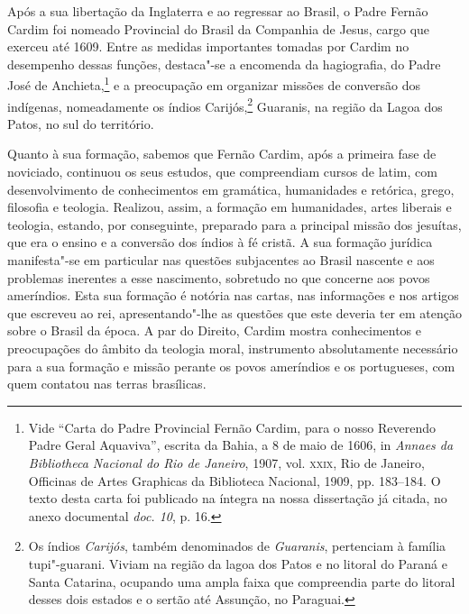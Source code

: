 Após a sua libertação da Inglaterra e ao regressar ao Brasil, o Padre
Fernão Cardim foi nomeado Provincial do Brasil da Companhia de Jesus,
cargo que exerceu até 1609. Entre as medidas importantes tomadas por
Cardim no desempenho dessas funções, destaca"-se a encomenda da
hagiografia, do Padre José de Anchieta,\footnote{ Vide
``Carta do Padre Provincial Fernão Cardim, para o nosso
Reverendo Padre Geral Aquaviva'', escrita da Bahia, a 8 de maio de
1606, in \textit{Annaes da Bibliotheca Nacional do Rio de Janeiro}, 
1907, vol. \textsc{xxix}, Rio de Janeiro, Officinas de Artes Graphicas da
Biblioteca Nacional, 1909, pp. 183--184. O texto desta carta foi
publicado na íntegra na nossa dissertação já citada, no anexo
documental \textit{doc. 10}, p. 16.} e a preocupação em organizar
missões de conversão dos indígenas, nomeadamente os índios
Carijós,\footnote{ Os índios \textit{Carijós}, também denominados
de \textit{Guaranis}, pertenciam à família tupi"-guarani. Viviam na
região da lagoa dos Patos e no litoral do Paraná e Santa Catarina,
ocupando uma ampla faixa que compreendia parte do litoral desses dois
estados e o sertão até Assunção, no Paraguai.} Guaranis, na região da
Lagoa dos Patos, no sul do território.

Quanto à sua formação, sabemos que Fernão Cardim, após a primeira
fase de noviciado, continuou os seus estudos, que compreendiam cursos
de latim, com desenvolvimento de conhecimentos em gramática,
humanidades e retórica, grego, filosofia e teologia. Realizou, assim, a
formação em humanidades, artes liberais e teologia, estando, por
conseguinte, preparado para a principal missão dos jesuítas, que era o
ensino e a conversão dos índios à fé cristã. A sua formação jurídica
manifesta"-se em particular nas questões subjacentes ao Brasil
nascente e aos problemas inerentes a esse nascimento, sobretudo no que
concerne aos povos ameríndios. Esta sua formação é notória nas cartas,
nas informações e nos artigos que escreveu ao rei,
apresentando"-lhe as questões que este deveria ter em atenção sobre o
Brasil da época.
A par do Direito, Cardim mostra conhecimentos e
preocupações do âmbito da teologia moral, instrumento absolutamente
necessário para a sua formação e missão perante os povos ameríndios e
os portugueses, com quem contatou nas terras brasílicas.

